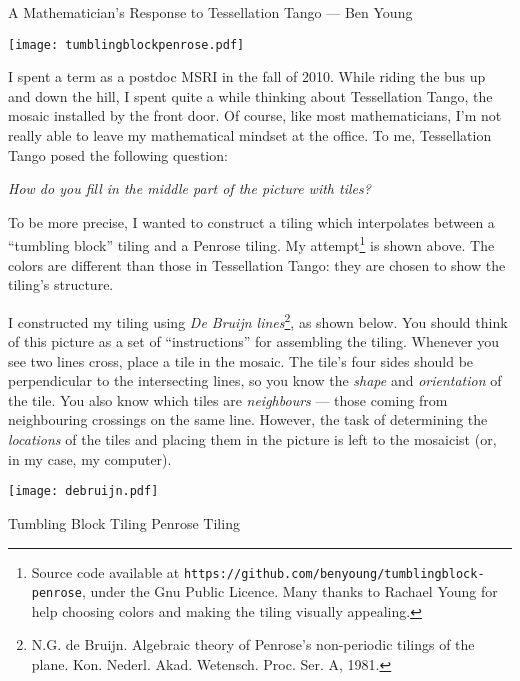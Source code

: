 \documentclass[11pt]{article}
\begin{document}
\begin{center}
\Large
A Mathematician's Response to Tessellation Tango --- Ben Young
\end{center}

\texttt{[image: tumblingblockpenrose.pdf]}

I spent a term as a postdoc MSRI in the fall of 2010.  While riding the bus up and down the hill, I spent quite a while thinking about Tessellation Tango, the mosaic installed by the front door.  Of course, like most mathematicians, I'm not really able to leave my mathematical mindset at the office.  To me, Tessellation Tango posed the following question: 
\begin{center}
\emph{How do you fill in the middle part of the picture with tiles?}
\end{center}
To be more precise, I wanted to construct a tiling which interpolates between a ``tumbling block''  tiling and a Penrose tiling.  My attempt\footnote{Source code available at \texttt{https://github.com/benyoung/tumblingblock-penrose}, under the Gnu Public Licence.  Many thanks to Rachael Young for help choosing colors and making the tiling visually appealing.} is shown above.  The colors are different than those in Tessellation Tango: they are chosen to show the tiling's structure.

I constructed my tiling using \emph{De Bruijn lines}\footnote{N.G. de Bruijn. Algebraic theory of Penrose's non-periodic tilings of the plane. Kon. Nederl. Akad. Wetensch. Proc. Ser. A, 1981.}, as shown below.  You should think of this picture as a set of ``instructions'' for assembling the tiling.  Whenever you see two lines cross, place a tile in the mosaic.  The tile's four sides should be perpendicular to the intersecting lines, so you know the \emph{shape} and \emph{orientation} of the tile.  You also know which tiles are \emph{neighbours} --- those coming from neighbouring crossings on the same line.  However, the task of determining the \emph{locations} of the tiles and placing them in the picture is left to the mosaicist (or, in my case, my computer).


\texttt{[image: debruijn.pdf]}

\small
\setlength{\parskip}{0in}
Tumbling Block Tiling
\hfill
Penrose Tiling
\end{document}
